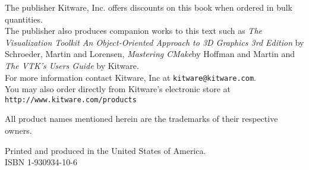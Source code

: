 \begin{minipage}[t][3cm][b]{\textwidth}
\begin{center}
The publisher Kitware, Inc. offers discounts on this book when ordered in bulk quantities.\\
The publisher also produces companion works to this text such as \emph{The Visualization Toolkit An Object-Oriented Approach to 3D Graphics 3rd Edition} by Schroeder, Martin and Lorensen, \emph{Mastering CMake}by Hoffman and Martin and \emph{The VTK's Users Guide} by Kitware.\\
For more information contact Kitware, Inc at \texttt{kitware@kitware.com}.\\
You may also order directly from Kitware's electronic store at \texttt{http://www.kitware.com/products}\\
\end{center}
\end{minipage}


\begin{minipage}[t][3cm][b]{\textwidth}
\begin{center}
All product names mentioned herein are the trademarks of their respective owners.
\end{center}
\end{minipage}


\begin{minipage}[t][3cm][b]{\textwidth}
\begin{center}
Printed and produced in the United States of America.\\
ISBN 1-930934-10-6
\end{center}
\end{minipage}


